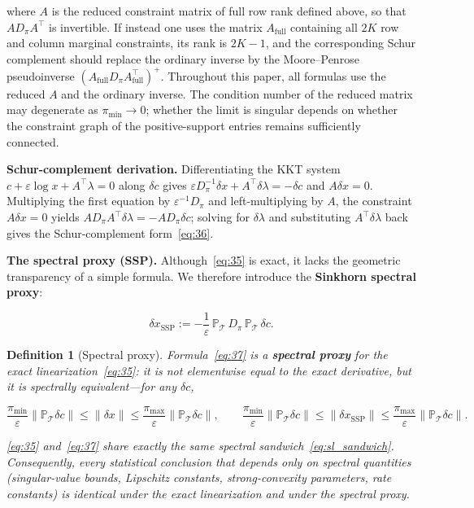 \documentclass[11pt,a4paper]{article}
\newtheorem{definition}[theorem]{Definition}
\theoremstyle{remark}
\begin{document}
where $A$ is the reduced constraint matrix of full row rank defined above, so that
$AD_\pi A^{\top}$ is invertible. If instead one uses the matrix $A_{\mathrm{full}}$
containing all $2K$ row and column marginal constraints, its rank is $2K-1$, and the
corresponding Schur complement should replace the ordinary inverse by the Moore--Penrose
pseudoinverse $(A_{\mathrm{full}}D_\pi A_{\mathrm{full}}^{\top})^{+}$. Throughout this
paper, all formulas use the reduced $A$ and the ordinary inverse. The condition number of
the reduced matrix may degenerate as $\pi_{\min}\to0$; whether the limit is singular
depends on whether the constraint graph of the positive-support entries remains
sufficiently connected.

\textbf{Schur-complement derivation.} Differentiating the KKT system
$c+\varepsilon\log x+A^{\top}\lambda=0$ along $\delta c$ gives
$\varepsilon D_\pi^{-1}\delta x+A^{\top}\delta\lambda=-\delta c$ and $A\delta x=0$.
Multiplying the first equation by $\varepsilon^{-1}D_\pi$ and left-multiplying by $A$, the
constraint $A\delta x=0$ yields $AD_\pi A^{\top}\delta\lambda=-AD_\pi\delta c$; solving for
$\delta\lambda$ and substituting $A^{\top}\delta\lambda$ back gives the Schur-complement
form~\eqref{eq:36}.

\textbf{The spectral proxy (SSP).} Although~\eqref{eq:35} is exact, it lacks the geometric
transparency of a simple formula. We therefore introduce the \textbf{Sinkhorn spectral
proxy}:

\begin{equation}
\boxed{\delta x_{\mathrm{SSP}}:=-\frac{1}{\varepsilon}\,\mathbb{P}_{\mathcal{T}}\,D_\pi\,\mathbb{P}_{\mathcal{T}}\,\delta c}. \label{eq:37}
\end{equation}

\begin{definition}[Spectral proxy]
Formula~\eqref{eq:37} is a \textbf{spectral proxy} for the exact
linearization~\eqref{eq:35}: it is \emph{not} elementwise equal to the exact derivative,
but it is \emph{spectrally equivalent}---for any $\delta c$,

\[
\frac{\pi_{\min}}{\varepsilon}\|\mathbb{P}_{\mathcal{T}}\delta c\|
\le\|\delta x\|
\le\frac{\pi_{\max}}{\varepsilon}\|\mathbb{P}_{\mathcal{T}}\delta c\|,
\qquad
\frac{\pi_{\min}}{\varepsilon}\|\mathbb{P}_{\mathcal{T}}\delta c\|
\le\|\delta x_{\mathrm{SSP}}\|
\le\frac{\pi_{\max}}{\varepsilon}\|\mathbb{P}_{\mathcal{T}}\delta c\|.
\]

\eqref{eq:35} and~\eqref{eq:37} share exactly the same spectral
sandwich~\eqref{eq:sl_sandwich}. Consequently, every statistical conclusion that depends
only on spectral quantities (singular-value bounds, Lipschitz constants, strong-convexity
parameters, rate constants) is identical under the exact linearization and under the
spectral proxy.
\end{definition}
\end{document}
